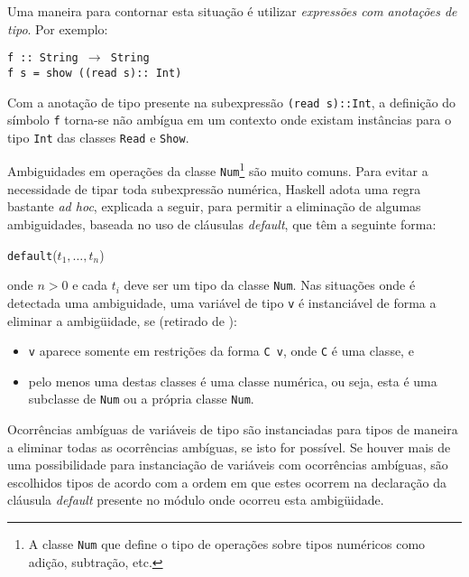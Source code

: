 Uma maneira para contornar esta situa\c{c}\~ao \'e utilizar \emph{express\~oes com anota\c{c}\~oes de tipo}. Por exemplo:

\begin{flushleft}
   \texttt{f :: String $\rightarrow$ String}\\
   \texttt{f s = show ((read s):: Int)}
\end{flushleft}

Com a anota\c{c}\~ao de tipo presente na subexpress\~ao \texttt{(read s)::Int}, a 
defini\c{c}\~ao do s\'imbolo \texttt{f} torna-se n\~ao amb\'igua em um contexto onde existam inst\^ancias para o tipo
\texttt{Int} das classes \texttt{Read} e \texttt{Show}.

Ambiguidades em opera\c{c}\~oes da classe \texttt{Num}\footnote{A classe \texttt{Num} que define o tipo de 
opera\c{c}\~oes sobre tipos num\'ericos como adi\c{c}\~ao, subtra\c{c}\~ao, etc.} 
s\~ao muito comuns. Para evitar a necessidade de tipar toda subexpress\~ao num\'erica, Haskell adota uma regra 
bastante \emph{ad hoc}, explicada a seguir, para permitir a elimina\c{c}\~ao de algumas ambiguidades, baseada no uso 
de cl\'ausulas \emph{default}, que t\^em a seguinte forma:
\begin{center}
   \texttt{default}($t_1,\ldots, t_n$)
\end{center}
onde $n > 0$ e cada $t_i$ deve ser um tipo da classe \texttt{Num}. Nas situa\c{c}\~oes
onde \'e 
detectada uma ambiguidade, uma vari\'avel de tipo \texttt{v} \'e instanci\'avel de forma a 
eliminar a ambig\"uidade, se (retirado de \cite{Haskell98}):

\begin{itemize}
   \item{\texttt{v} aparece somente em restri\c{c}\~oes da forma \texttt{C v}, onde \texttt{C} \'e uma
         classe, e}
   \item{pelo menos uma destas classes \'e uma classe num\'erica, ou seja, esta \'e uma subclasse de
         \texttt{Num} ou a pr\'opria classe \texttt{Num}.}
\end{itemize}

Ocorr\^encias amb\'iguas de vari\'aveis de tipo s\~ao instanciadas para tipos de maneira a eliminar 
todas as ocorr\^encias amb\'iguas, se isto for poss\'ivel. Se houver mais de uma 
possibilidade para instancia\c{c}\~ao de vari\'aveis com ocorr\^encias amb\'iguas, s\~ao escolhidos tipos 
de acordo com a ordem em que estes ocorrem na declara\c{c}\~ao da cl\'ausula \emph{default} presente 
no m\'odulo onde ocorreu esta ambig\"uidade.

